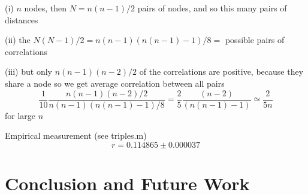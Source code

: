 \documentclass{article}
\begin{document}
(i) $n$ nodes, then $N = n (n-1)/2$ pairs of nodes, and so this many pairs of distances

(ii) the $N (N-1) /2 = n (n-1) (n (n-1) -1)/8 = $ possible pairs of
correlations

(iii) but only $n(n-1)(n-2)/2$ of the correlations are positive,
because they share a node so we get average correlation between all
pairs
 \[ \frac{1}{10} \frac{n(n-1)(n-2)/2}{n (n-1) (n (n-1) -1)/8} =
    \frac{2}{5} \frac{(n-2)}{(n (n-1) -1)}
   \simeq 
   \frac{2}{5n}
\]
for large $n$

Empirical measurement (see triples.m)
\[ r = 0.114865 \pm 0.000037\]
 
 
\section{Conclusion and Future Work}




\setlength{\parskip}{1mm}


% 
\end{document}
